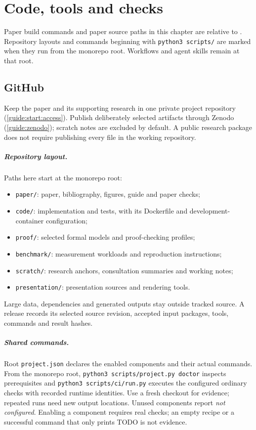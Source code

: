 \chapter{Code, tools and checks}\label{guide:code}

Paper build commands and paper source paths in this chapter are relative to . Repository layouts and commands beginning with \texttt{python3 scripts/} are marked when they run from the monorepo root. Workflows and agent skills remain at that root.
\section{GitHub}\label{guide:code:github}
Keep the paper and its supporting research in one private project repository (\cref{guide:start:access}). Publish deliberately selected artifacts through Zenodo (\cref{guide:zenodo}); scratch notes are excluded by default. A public research package does not require publishing every file in the working repository.

\paragraph{Repository layout.} Paths here start at the monorepo root:
\begin{itemize}[noitemsep]
  \item \texttt{paper/}: paper, bibliography, figures, guide and paper checks;
  \item \texttt{code/}: implementation and tests, with its Dockerfile and development-container configuration;
  \item \texttt{proof/}: selected formal models and proof-checking profiles;
  \item \texttt{benchmark/}: measurement workloads and reproduction instructions;
  \item \texttt{scratch/}: research anchors, consultation summaries and working notes;
  \item \texttt{presentation/}: presentation sources and rendering tools.
\end{itemize}
Large data, dependencies and generated outputs stay outside tracked source. A release records its selected source revision, accepted input packages, tools, commands and result hashes.

\paragraph{Shared commands.} Root \texttt{project.json} declares the enabled components and their actual commands. From the monorepo root, \texttt{python3 scripts/project.py doctor} inspects prerequisites and \texttt{python3 scripts/ci/run.py} executes the configured ordinary checks with recorded runtime identities. Use a fresh checkout for evidence; repeated runs need new output locations. Unused components report \emph{not configured}. Enabling a component requires real checks; an empty recipe or a successful command that only prints TODO is not evidence.

